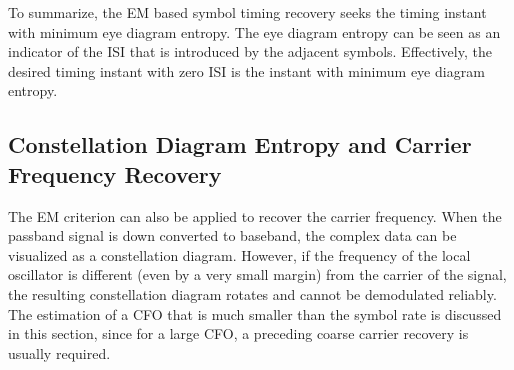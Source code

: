 \documentclass[12pt, draftclsnofoot, onecolumn]{IEEEtran}
\begin{document}
To summarize, the EM based symbol timing recovery seeks the timing instant with minimum eye diagram entropy. 
The eye diagram entropy can be seen as an indicator of the ISI that is introduced by the adjacent symbols.
Effectively, the  desired timing instant with zero ISI is the instant with minimum eye diagram entropy. 


\subsection{Constellation Diagram Entropy and Carrier Frequency Recovery}
\label{sec:const_entp}
The EM criterion can also be applied to recover the carrier frequency.
When the passband signal is down converted to baseband, the complex data can be visualized as a constellation diagram.
However, if the frequency of the local oscillator is  different (even by a very small margin) from the carrier of the signal, the resulting constellation diagram rotates and cannot be demodulated reliably.
The estimation of a CFO that is much smaller than the symbol rate is discussed in this section, since for a large CFO, a preceding coarse carrier recovery is usually required.
\end{document}
